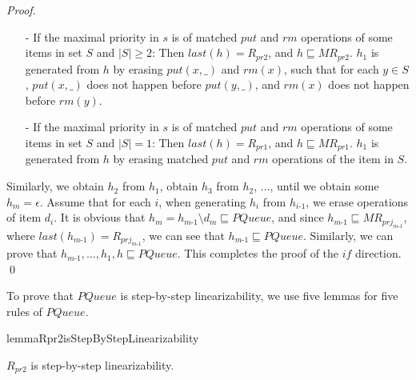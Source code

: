 \begin {proof}
\begin{itemize}
\item[-] If the maximal priority in $s$ is of matched $\textit{put}$ and $\textit{rm}$ operations of some items in set $S$ and $\vert S \vert \geq 2$: Then $\textit{last}(h) = R_{\textit{pr2}}$, and $h \sqsubseteq \textit{MR}_{\textit{pr2}}$. $h_1$ is generated from $h$ by erasing $\textit{put}(x,\_)$ and $\textit{rm}(x)$, such that for each $y \in S$, $\textit{put}(x,\_)$ does not happen before $\textit{put}(y,\_)$, and $\textit{rm}(x)$ does not happen before $\textit{rm}(y)$.

\item[-] If the maximal priority in $s$ is of matched $\textit{put}$ and $\textit{rm}$ operations of some items in set $S$ and $\vert S \vert = 1$: Then $\textit{last}(h) = R_{\textit{pr1}}$, and $h \sqsubseteq \textit{MR}_{\textit{pr1}}$. $h_1$ is generated from $h$ by erasing matched $\textit{put}$ and $\textit{rm}$ operations of the item in $S$.
\end{itemize}

Similarly, we obtain $h_2$ from $h_1$, obtain $h_3$ from $h_2$, $\ldots$, until we obtain some $h_m = \epsilon$. Assume that for each $i$, when generating $h_i$ from $h_{\textit{i-1}}$, we erase operations of item $d_i$. It is obvious that $h_m = h_{\textit{m-1}} \setminus d_m \sqsubseteq \textit{PQueue}$, and since $h_{\textit{m-1}} \sqsubseteq \textit{MR}_{\textit{prj}_{\textit{m-1}}}$, where $\textit{last}(h_{\textit{m-1}}) = R_{\textit{prj}_{\textit{m-1}}}$, we can see that $h_{\textit{m-1}} \sqsubseteq \textit{PQueue}$. Similarly, we can prove that $h_{\textit{m-1}},\ldots,h_1,h \sqsubseteq \textit{PQueue}$. This completes the proof of the $\textit{if}$ direction. \qed
\end {proof}


To prove that $\textit{PQueue}$ is step-by-step linearizability, we use five lemmas for five rules of $\textit{PQueue}$.




\begin{restatable}{lemma}{Rpr2isStepByStepLinearizability}
\label{lemma:Rpr2 is step-by-step linearizability}

$R_{\textit{pr2}}$ is step-by-step linearizability.

\end{restatable}

